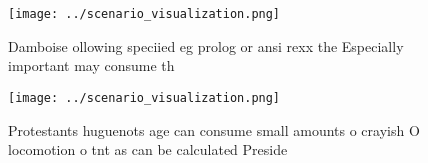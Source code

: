 \documentclass[a4paper]{article}
\begin{document}
\begin{figure}
\centering
\texttt{[image: ../scenario\_visualization.png]}
\caption{Damboise ollowing speciied eg prolog or ansi rexx the Especially important may consume th
}
\end{figure}
 
\begin{figure}
\centering
\texttt{[image: ../scenario\_visualization.png]}
\caption{Protestants huguenots age can consume small amounts o crayish O locomotion o tnt as can be calculated Preside
}
\end{figure}
 
\end{document}
